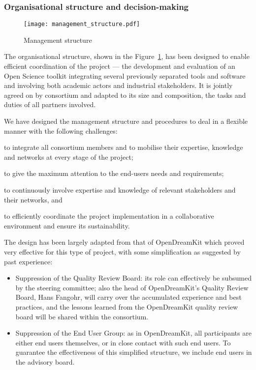 \subsubsection{Organisational structure and decision-making}

\begin{figure}
  \centering
  \texttt{[image: management\_structure.pdf]}
  \caption{Management structure}
  \label{figure.management}
\end{figure}

The organisational structure, shown in the Figure~\ref{figure.management}, has been designed
to enable efficient coordination of the project --- the
development and evaluation of an Open Science toolkit
integrating several previously separated tools and software and
involving both academic actors and industrial stakeholders. It is jointly agreed on
by \TheProject consortium and adapted to its size and composition,
the tasks and duties of all partners involved.

We have designed the management structure and procedures to deal in a
flexible manner with the following challenges:
\begin{compactitem}
\item to integrate all consortium members and to mobilise their
  expertise, knowledge and networks at every stage of the project;
\item to give the maximum attention to the end-users needs and
  requirements;
\item to continuously involve expertise and knowledge of relevant
  stakeholders and their networks, and
\item to efficiently coordinate the project implementation in a
  collaborative environment and ensure its sustainability.
\end{compactitem}

The design has been largely adapted from that of OpenDreamKit which
proved very effective for this type of project, with some
simplification as suggested by past experience:
\begin{itemize}
\item Suppression of the Quality Review Board: its role can
  effectively be subsumed by the steering committee; also the head of
  OpenDreamKit's Quality Review Board, Hans Fangohr, will carry over
  the accumulated experience and best practices, and the lessons
  learned from the OpenDreamKit quality review board will be shared
  within the \TheProject consortium.
\item Suppression of the End User Group: as in OpenDreamKit, all
  participants are either end users themselves, or in close contact
  with such end users. To guarantee the effectiveness of this
  simplified structure, we include end users in the advisory board.
\end{itemize}


